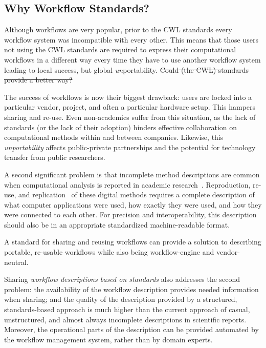 \documentclass[sigconf,revew,screen,timestamp,nonacm]{acmart}
\newcommand{\addition}[1]{{\color{brown} #1}}
\newcommand{\modification}[1]{{\color{blue} #1}}
\newcommand{\deletion}[1]{{\color{red} \sout{#1}}}
\begin{document}
\subsection{Why Workflow Standards?}\label{sec:bg:standard}

Although workflows are very popular, \modification{prior to the CWL standards every workflow system was incompatible with every other}. This means that those users not using the CWL standards are required to express their computational workflows in a different way every time they have to use another workflow system leading to local success, but global \textit{un}portability. \deletion{Could (the CWL) standards provide a better way?}

The success of workflows is now their biggest drawback: users are locked into a particular vendor, project, and often a particular hardware setup. This hampers sharing and re-use. Even non-academics suffer from this situation, as the lack of standards (or the lack of their adoption) hinders effective collaboration on computational methods within and between companies. Likewise, this \textit{unportability} affects public-private partnerships and the potential for technology transfer from public researchers.

\addition{A second significant problem is that incomplete method descriptions are common when computational analysis is reported in academic research~\cite{ivie_reproducibility_2018}. Reproduction, re-use, and replication~\cite{feitelson_repeatability_2015} of these digital methods requires a complete description of what computer applications were used, how exactly they were used, and how they were connected to each other. For precision and interoperability, this description should also be in an appropriate standardized machine-readable format.}

A standard for sharing and reusing workflows can provide a solution to describing portable, re-usable workflows while also being workflow-engine and vendor-neutral.

\addition{Sharing \textit{workflow descriptions based on standards} also addresses the second problem: the availability of the workflow description provides needed information when sharing; and the quality of the description provided by a structured, standards-based approach is much higher than the current approach of \modification{casual, unstructured, and almost always incomplete} descriptions in scientific reports. Moreover, the operational parts of the description can be provided automated by the workflow management system, rather than by domain experts.}
\end{document}
